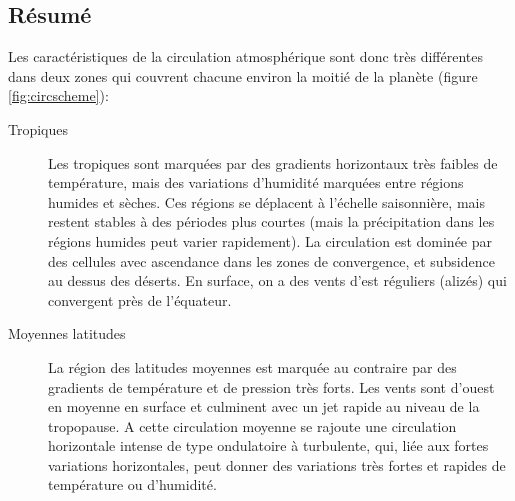 \sk
\subsection{Résumé}

\sk
Les caractéristiques de la circulation atmosphérique sont donc très différentes dans deux zones qui couvrent chacune environ la moitié de la planète (figure \ref{fig:circscheme}):
\begin{description}
\item[Tropiques] Les tropiques sont marquées par des gradients horizontaux très faibles de température, mais des variations d'humidité marquées entre régions humides et sèches. Ces régions se déplacent à l'échelle saisonnière, mais restent stables à des périodes plus courtes (mais la précipitation dans les régions humides peut varier rapidement). La circulation est dominée par des cellules avec ascendance dans les zones de convergence, et subsidence au dessus des déserts. En surface, on a des vents d'est réguliers (alizés) qui convergent près de l'équateur.
\item[Moyennes latitudes] La région des latitudes moyennes est marquée au contraire par des gradients de température et de pression très forts. Les vents sont d'ouest en moyenne en surface et culminent avec un jet rapide au niveau de la tropopause. A cette circulation moyenne se rajoute une circulation horizontale intense de type ondulatoire à turbulente, qui, liée aux fortes variations horizontales, peut donner des variations très fortes et rapides de température ou d'humidité.
\end{description}


%

